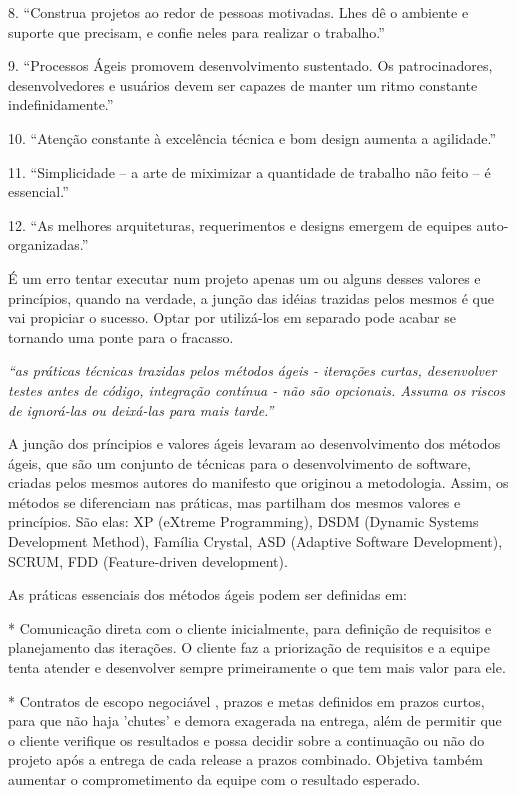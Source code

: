\documentclass[a4paper,11pt,abntfigtabnum,noindentfirst]{abnt}
\begin{document}
   8. ``Construa projetos ao redor de pessoas motivadas. Lhes dê o ambiente e suporte que precisam, e confie neles para realizar o trabalho.''

   9. ``Processos Ágeis promovem desenvolvimento sustentado. Os patrocinadores, desenvolvedores e usuários devem ser capazes de manter um ritmo constante indefinidamente.''

  10. ``Atenção constante à excelência técnica e bom design aumenta a agilidade.''

  11. ``Simplicidade – a arte de miximizar a quantidade de trabalho não feito – é essencial.''

  12. ``As melhores arquiteturas, requerimentos e designs emergem de equipes auto-organizadas.''

É um erro tentar executar num projeto apenas um ou alguns desses valores e princípios, quando na verdade, a junção das idéias trazidas pelos mesmos é que vai propiciar o sucesso. Optar por utilizá-los em separado pode acabar se tornando uma ponte para o fracasso. 

\begin{center}\textsl{``as práticas técnicas trazidas pelos métodos ágeis - iterações curtas, desenvolver testes antes de código, integração contínua - não são opcionais. Assuma os riscos de ignorá-las ou deixá-las para mais tarde.''}  \end{center}

A junção dos príncipios e valores ágeis levaram ao desenvolvimento dos métodos ágeis, que são um conjunto de técnicas para o desenvolvimento de software, criadas pelos mesmos autores do manifesto que originou a metodologia. Assim,  os métodos se diferenciam nas práticas, mas partilham dos mesmos valores e princípios. São elas: XP (eXtreme Programming), DSDM (Dynamic Systems Development Method), Família Crystal, ASD (Adaptive Software Development), SCRUM, FDD (Feature-driven development).

As práticas essenciais dos métodos ágeis podem ser definidas em:

    * Comunicação direta com o cliente inicialmente, para definição de requisitos e planejamento das iterações. O cliente faz a priorização de requisitos e a equipe tenta atender e desenvolver sempre primeiramente o que tem mais valor para ele. 

    * Contratos de escopo negociável , prazos e metas definidos em prazos curtos, para que não haja 'chutes' e demora exagerada na entrega, além de permitir que o cliente verifique os resultados e possa decidir sobre a continuação ou não do projeto após a entrega de cada release a prazos combinado. Objetiva também aumentar o comprometimento da equipe com o resultado esperado.
\end{document}
